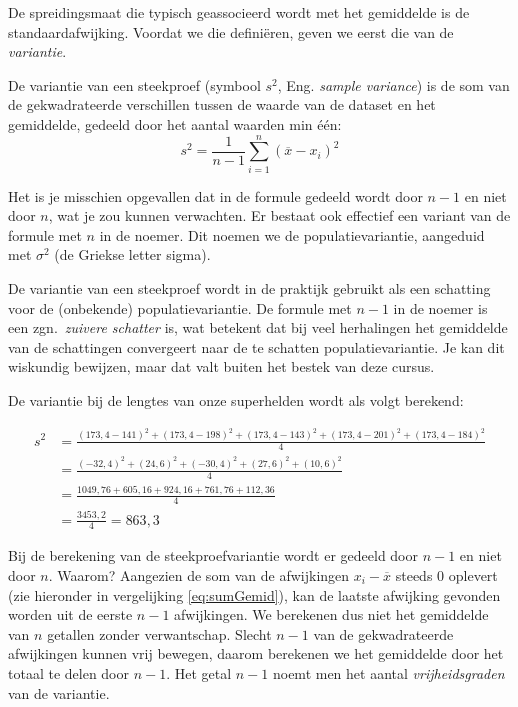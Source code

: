 De spreidingsmaat die typisch geassocieerd wordt met het gemiddelde is de standaardafwijking. Voordat we die definiëren, geven we eerst die van de \emph{variantie}.

\begin{definition}[Variantie]
  De  variantie van een steekproef (symbool $s^{2}$, Eng. \emph{sample variance}) is de som van de gekwadrateerde verschillen tussen de waarde van de dataset en het gemiddelde, gedeeld door het aantal waarden min één:
  \begin{equation}
  s^{2} = \frac{1}{n-1} \sum_{i=1}^{n} \left(\overline{x} - x_i \right)^{2}
  \label{eq:variantie}
  \end{equation}
\end{definition}

Het is je misschien opgevallen dat in de formule gedeeld wordt door $n-1$ en niet door $n$, wat je zou kunnen verwachten. Er bestaat ook effectief een variant van de formule met $n$ in de noemer. Dit noemen we de populatievariantie, aangeduid met $\sigma^2$ (de Griekse letter sigma).

De variantie van een steekproef wordt in de praktijk gebruikt als een schatting voor de (onbekende) populatievariantie. De formule met $n-1$ in de noemer is een zgn.~\textit{zuivere schatter} is, wat betekent dat bij veel herhalingen het gemiddelde van de schattingen convergeert naar de te schatten populatievariantie. Je kan dit wiskundig bewijzen, maar dat valt buiten het bestek van deze cursus.

\begin{example}
  De variantie bij de lengtes van onze superhelden wordt als volgt berekend:
  
  \begin{align*}
  	s^{2} & =  \frac{(173,4 - 141)^{2} + (173,4 - 198 )^{2} + (173,4 - 143)^{2} + (173,4 - 201)^{2} + (173,4 - 184 )^{2}}{4} \\
  	      & =  \frac{(-32,4)^{2} + (24,6)^{2} + (-30,4)^{2} + (27,6)^{2} + (10,6)^{2}}{4}                                    \\
  	      & = \frac{1049,76 + 605,16 + 924,16 + 761,76 + 112,36}{4}                                                          \\
  	      & = \frac{3453,2}{4} = 863,3
  \end{align*}
\end{example}

Bij de berekening van de steekproefvariantie wordt er gedeeld door $n-1$ en niet door $n$. Waarom? Aangezien de som van de afwijkingen $x_{i} - \overline{x}$ steeds 0 oplevert (zie hieronder in vergelijking \ref{eq:sumGemid}), kan de laatste afwijking gevonden worden uit de eerste $n-1$ afwijkingen. We berekenen dus niet het gemiddelde van $n$ getallen zonder verwantschap. Slecht $n-1$ van de gekwadrateerde afwijkingen kunnen vrij bewegen, daarom berekenen we het gemiddelde door het totaal te delen door $n-1$. Het getal $n-1$ noemt men het aantal \emph{vrijheidsgraden} van de variantie.

